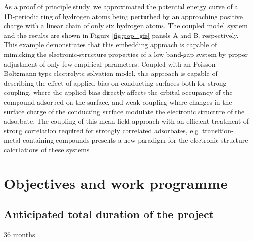 \documentclass[a4paper,11pt,headings=normal]{scrartcl}
\begin{document}
\noindent
As a proof of principle study, we approximated the potential energy curve of a 
1D-periodic ring of hydrogen atoms being perturbed by an approaching positive  
charge with a linear chain of only six hydrogen atoms. The coupled model system 
and the results are shown in Figure \ref{fig:pop_gfe} panels A and B, 
respectively. This example demonstrates that this embedding 
approach is capable of mimicking the electronic-structure properties of a low 
band-gap system by proper adjustment of only few empirical parameters. 
Coupled with an Poisson--Boltzmann type electrolyte solvation 
model,\autocite{stein2019} this approach 
is capable of describing the effect of applied bias on conducting surfaces both 
for strong coupling, where the applied bias directly affects the orbital 
occupancy of the compound  adsorbed on the surface, and weak 
coupling where changes in the surface charge of the conducting surface modulate 
the electronic structure of the adsorbate. The coupling of this mean-field 
approach with an efficient treatment of strong correlation required for strongly 
correlated adsorbates, e.g. transition-metal containing compounds presents a new 
paradigm for the electronic-structure calculations of these systems.


\section{Objectives and work programme}

\subsection{Anticipated total duration of the project}
36 months
\end{document}
